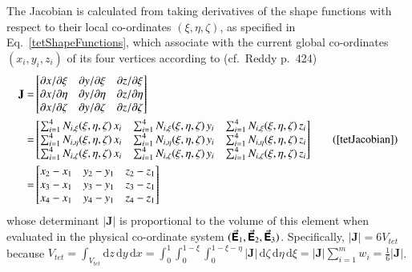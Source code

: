 The Jacobian is calculated from taking derivatives of the shape functions with respect to their local co-ordinates $(\xi, \eta, \zeta)$, as specified in Eq.~\ref{tetShapeFunctions}, which associate with the current global co-ordinates $(x_i, y_i, z_i)$ of its four vertices according to (cf.\ Reddy \cite{Reddy93} p.~424)
\begin{equation}
\begin{aligned}
\mathbf{J}= &
\begin{bmatrix}
\partial x / \partial\xi & \partial y / \partial\xi & \partial z / \partial\xi\\
\partial x / \partial\eta & \partial y / \partial\eta & \partial z / \partial\eta \\
\partial x / \partial\zeta & \partial y / \partial\zeta & \partial z / \partial\zeta 
\end{bmatrix} \\
= & \begin{bmatrix}
\sum\nolimits_{i=1}^4 N_{i,\xi} (\xi,\eta,\zeta) \, x_i & \sum\nolimits_{i=1}^4 N_{i,\xi} (\xi,\eta,\zeta) \, y_i &
\sum\nolimits_{i=1}^4 N_{i,\xi} (\xi,\eta,\zeta) \, z_i\\
\sum\nolimits_{i=1}^4 N_{i,\eta} (\xi,\eta,\zeta) \, x_i & \sum\nolimits_{i=1}^4 N_{i,\eta} (\xi,\eta,\zeta) \, y_i &
\sum\nolimits_{i=1}^4 N_{i,\eta} (\xi,\eta,\zeta) \, z_i\\
\sum\nolimits_{i=1}^4 N_{i,\zeta} (\xi,\eta,\zeta) \, x_i & \sum\nolimits_{i=1}^4 N_{i,\zeta} (\xi,\eta,\zeta) \, y_i &
\sum\nolimits_{i=1}^4 N_{i,\zeta} (\xi,\eta,\zeta) \, z_i
\end{bmatrix} \\
= & \begin{bmatrix}
x_2 - x_1 & y_2 - y_1 & z_2 - z_1 \\
x_3 - x_1 & y_3 - y_1 & z_3 - z_1 \\
x_4 - x_1 & y_4 - y_1 & z_4 - z_1
\end{bmatrix}
\end{aligned}
\tag{\ref{tetJacobian}}
\end{equation}
whose determinant $| \mathbf{J} |$ is proportional to the volume of this element when evaluated in the physical co-ordinate system $( \vec{\boldsymbol{\mathsf{E}}}_1 , \vec{\boldsymbol{\mathsf{E}}}_2 , \vec{\boldsymbol{\mathsf{E}}}_3 )$.  Specifically, $| \mathbf{J} | = 6V_{tet}$ because $V_{tet} = \int_{V_{tet}} \mathrm{d} z \, \mathrm{d} y \, \mathrm{d} x = \int_0^1 \int_0^{1-\xi} \int_0^{1-\xi-\eta} | \mathbf{J} | \, \mathrm{d} \zeta \, \mathrm{d} \eta \, \mathrm{d} \xi = | \mathbf{J} | \sum_{i=1}^m w_i = \tfrac{1}{6} | \mathbf{J} |$.  

